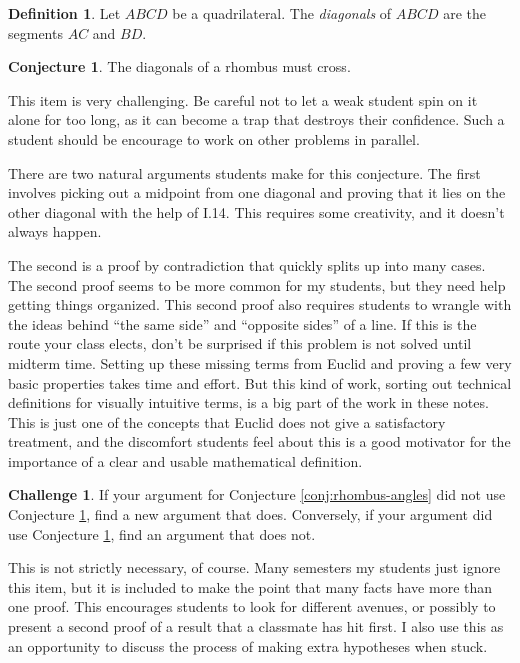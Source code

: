 \documentclass{tufte-handout}
\theoremstyle{definition}
\newtheorem{conjecture}[problem]{Conjecture}
\newtheorem*{definition}{Definition}
\newtheorem{challenge}[problem]{Challenge}
\begin{document}
\begin{definition}\label{defn:diagonals}
Let $ABCD$ be a quadrilateral. The \emph{diagonals} of $ABCD$ are the segments $AC$ and $BD$.
\end{definition}

\begin{conjecture}
\label{conj:rhombus-diagonals}
The diagonals of a rhombus must cross.
\end{conjecture}

This item is very challenging.
Be careful not to let a weak student spin on it alone for too long, as it can become a trap that destroys their confidence.
Such a student should be encourage to work on other problems in parallel.

There are two natural arguments students make for this conjecture.
The first involves picking out a midpoint from one diagonal and proving that it lies on the other diagonal with the help of I.14.
This requires some creativity, and it doesn't always happen.

The second is a proof by contradiction that quickly splits up into many cases.
The second proof seems to be more common for my students, but they need help getting things organized.
This second proof also requires students to wrangle with the ideas behind ``the same side'' and ``opposite sides'' of a line.
If this is the route your class elects, don't be surprised if this problem is not solved until midterm time.
Setting up these missing terms from Euclid and proving a few very basic properties takes time and effort. But this kind of work, sorting out technical definitions for visually intuitive terms, is a big part of the work in these notes. This is just one of the concepts that Euclid does not give a satisfactory treatment, and the discomfort students feel about this is a good motivator for the importance of a clear and usable mathematical definition.


\begin{challenge}
\label{conj:rhombus-angles-redo}
If your argument for Conjecture \ref{conj:rhombus-angles} did not use Conjecture \ref{conj:rhombus-diagonals}, find a new argument that does.
Conversely, if your argument did use Conjecture \ref{conj:rhombus-diagonals}, find an argument that does not.
\end{challenge}

This is not strictly necessary, of course. 
Many semesters my students just ignore this item, but
it is included to make the point that many facts have more than one proof.
This encourages students to look for different avenues, or possibly to present a second proof of a result that a classmate has hit first.
I also use this as an opportunity to discuss the process of making extra hypotheses when stuck.
\end{document}
